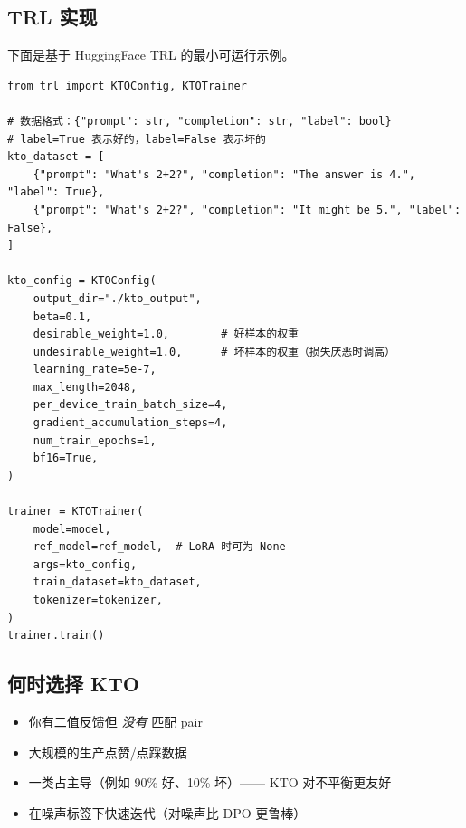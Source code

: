 \subsection{TRL 实现}
\label{trl-implementation-1}

下面是基于 HuggingFace TRL 的最小可运行示例。

\begin{lstlisting}[style=pythonstyle]
from trl import KTOConfig, KTOTrainer

# 数据格式：{"prompt": str, "completion": str, "label": bool}
# label=True 表示好的，label=False 表示坏的
kto_dataset = [
    {"prompt": "What's 2+2?", "completion": "The answer is 4.", "label": True},
    {"prompt": "What's 2+2?", "completion": "It might be 5.", "label": False},
]

kto_config = KTOConfig(
    output_dir="./kto_output",
    beta=0.1,
    desirable_weight=1.0,        # 好样本的权重
    undesirable_weight=1.0,      # 坏样本的权重（损失厌恶时调高）
    learning_rate=5e-7,
    max_length=2048,
    per_device_train_batch_size=4,
    gradient_accumulation_steps=4,
    num_train_epochs=1,
    bf16=True,
)

trainer = KTOTrainer(
    model=model,
    ref_model=ref_model,  # LoRA 时可为 None
    args=kto_config,
    train_dataset=kto_dataset,
    tokenizer=tokenizer,
)
trainer.train()
\end{lstlisting}

\subsection{何时选择 KTO}
\label{when-to-choose-kto}

\begin{itemize}
  \item 你有二值反馈但 \emph{没有} 匹配 pair
  \item 大规模的生产点赞/点踩数据
  \item 一类占主导（例如 90\% 好、10\% 坏）—— KTO 对不平衡更友好
  \item 在噪声标签下快速迭代（对噪声比 DPO 更鲁棒）
\end{itemize}

